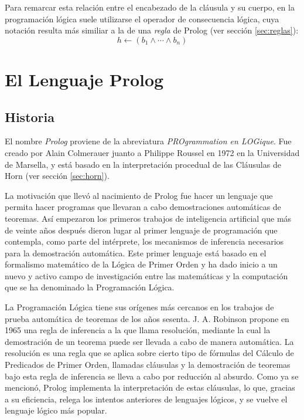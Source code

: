 \documentclass[12pt,titlepage]{article}
\begin{document}
Para remarcar esta relación entre el encabezado de la cláusula y su cuerpo, en la programación lógica suele utilizarse el operador de consecuencia lógica, cuya notación resulta más similiar a la de una \emph{regla} de Prolog (ver sección \ref{sec:reglas}):
\begin{equation*} 
h \leftarrow (b_1 \land \cdots \land b_n)
\end{equation*}

\newpage
\section{El Lenguaje Prolog}

\subsection{Historia}

El nombre \textit{Prolog} proviene de la abreviatura \textit{PROgrammation en LOGique}. Fue creado por Alain Colmerauer juanto a Philippe Roussel en 1972 en la Universidad de Marsella, y está basado en la interpretación procedual de las Cláusulas de Horn (ver sección \ref{sec:horn}).

La motivación que llevó al nacimiento de Prolog fue hacer un lenguaje que permita hacer programas que llevaran a cabo demostraciones automáticas de teoremas. Así empezaron los primeros trabajos de inteligencia artificial que más de veinte años después dieron lugar al primer lenguaje de programación que contempla, como parte del intérprete, los mecanismos de inferencia necesarios para la demostración automática. Este primer lenguaje está basado en el formalismo matemático de la Lógica de Primer Orden y ha dado inicio a un nuevo y activo campo de investigación entre las matemáticas y la computación que se ha denominado la Programación Lógica.

La Programación Lógica tiene sus orígenes más cercanos en los trabajos de prueba automática de teoremas de los años sesenta. J. A. Robinson propone en 1965 una regla de inferencia a la que llama resolución, mediante la cual la demostración de un teorema puede ser llevada a cabo de manera automática. La resolución es una regla que se aplica sobre cierto tipo de fórmulas del Cálculo de Predicados de Primer Orden, llamadas cláusulas y la demostración de teoremas bajo esta regla de inferencia se lleva a cabo por reducción al absurdo. Como ya se mencionó, Prolog implementa la interpretación de estas cláusulas, lo que, gracias a su eficiencia, relega los intentos anteriores de lenguajes lógicos, y se vuelve el lenguaje lógico más popular.
\end{document}
